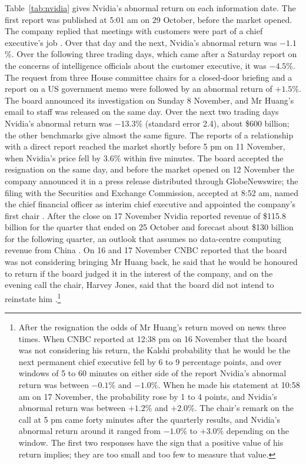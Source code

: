 \documentclass[11pt,a4paper]{article}
\begin{document}
Table~\ref{tab:nvidia} gives Nvidia's abnormal return on each information date. The first report was published at 5:01 am on 29 October, before the market opened. The company replied that meetings with customers were part of a chief executive's job \citep{techcrunch2026timeline}. Over that day and the next, Nvidia's abnormal return was $-1.1$\%. Over the following three trading days, which came after a Saturday report on the concerns of intelligence officials about the customer executive, it was $-4.5$\%. The request from three House committee chairs for a closed-door briefing and a report on a US government memo were followed by an abnormal return of $+1.5$\%. The board announced its investigation on Sunday 8 November, and Mr Huang's email to staff was released on the same day. Over the next two trading days Nvidia's abnormal return was $-13.3$\% (standard error 2.4), about \$600 billion; the other benchmarks give almost the same figure. The reports of a relationship with a direct report reached the market shortly before 5 pm on 11 November, when Nvidia's price fell by 3.6\% within five minutes. The board accepted the resignation on the same day, and before the market opened on 12 November the company announced it in a press release distributed through GlobeNewswire; the filing with the Securities and Exchange Commission, accepted at 8:52 am, named the chief financial officer as interim chief executive and appointed the company's first chair \citep{nvidia2026eightk}. After the close on 17 November Nvidia reported revenue of \$115.8 billion for the quarter that ended on 25 October and forecast about \$130 billion for the following quarter, an outlook that assumes no data-centre computing revenue from China \citep{nvidia2026q3}. On 16 and 17 November CNBC reported that the board was not considering bringing Mr Huang back, he said that he would be honoured to return if the board judged it in the interest of the company, and on the evening call the chair, Harvey Jones, said that the board did not intend to reinstate him \citep{cnbc2026nov16,cnbc2026nov17,techcrunch2026nov17}.\footnote{After the resignation the odds of Mr Huang's return moved on news three times. When CNBC reported at 12:38 pm on 16 November that the board was not considering his return, the Kalshi probability that he would be the next permanent chief executive fell by 6 to 9 percentage points, and over windows of 5 to 60 minutes on either side of the report Nvidia's abnormal return was between $-0.1$\% and $-1.0$\%. When he made his statement at 10:58 am on 17 November, the probability rose by 1 to 4 points, and Nvidia's abnormal return was between $+1.2$\% and $+2.0$\%. The chair's remark on the call at 5 pm came forty minutes after the quarterly results, and Nvidia's abnormal return around it ranged from $-1.0$\% to $+3.0$\% depending on the window. The first two responses have the sign that a positive value of his return implies; they are too small and too few to measure that value.}
\end{document}
